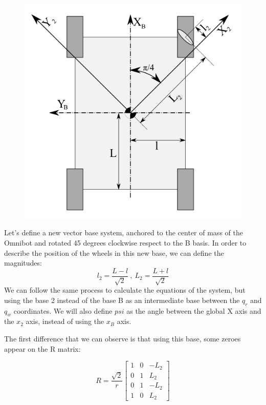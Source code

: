 \documentclass[12pt]{article}
\begin{document}
\begin{figure}
	\centering
	\includegraphics[width=\linewidth]{Omnibot_45_deg.png}
	\label{fig:omnibot}
\end{figure}
Let's define a new vector base system, anchored to the center of mass of the Omnibot and rotated 45 degrees clockwise respect to the B basis.
In order to describe the position of the wheels in this new base, we can define the magnitudes:
$$ l_2 = \frac{L-l}{\sqrt{2}}\ , \ L_2 = \frac{L+l}{\sqrt{2}}$$
We can follow the same process to calculate the equations of the system, but using the base 2 instead of the base B as an intermediate base between the $q_r$ and $q_w$ coordinates. We will also define $psi$ as the angle between the global X axis and the $x_2$ axis, instead of using the $x_B$ axis.

The first difference that we can observe is that using this base, some zeroes appear on the R matrix:

$$ R = \frac{\sqrt{2}}{r}\left[\begin{matrix}1 & 0 & - L_{2}\\0 & 1 & L_{2}\\0 & 1 & - L_{2}\\1 & 0 & L_{2}\end{matrix}\right]$$
\end{document}

